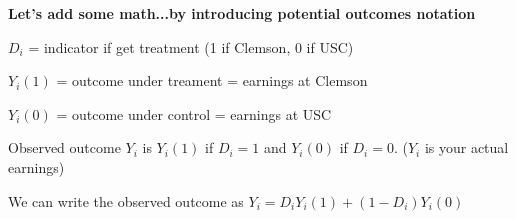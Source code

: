 \documentclass[11pt, aspectratio=169]{beamer}
\newenvironment{wideitemize}{\itemize\addtolength{\itemsep}{5pt}}{\enditemize}
\begin{document}

\begin{frame}{\bf \large Let's add some math...by introducing \textbf{potential outcomes} notation}
\begin{wideitemize}
	
	\item $D_i$ = indicator if get treatment (1 if Clemson, 0 if USC)
	

	\item $Y_i(1)$ = outcome under treament = earnings at Clemson
	\item $Y_i(0)$ = outcome under control = earnings at USC
	
\vspace{10mm}

	\item Observed outcome $Y_i$ is $Y_i(1)$ if $D_i = 1$ and $Y_i(0)$ if $D_i = 0$. ($Y_i$ is your actual earnings)
	
	\item
	We can write the observed outcome as $Y_i = D_i Y_i(1) + (1-D_i) Y_i(0)$
\end{wideitemize}

\end{frame}
\end{document}
